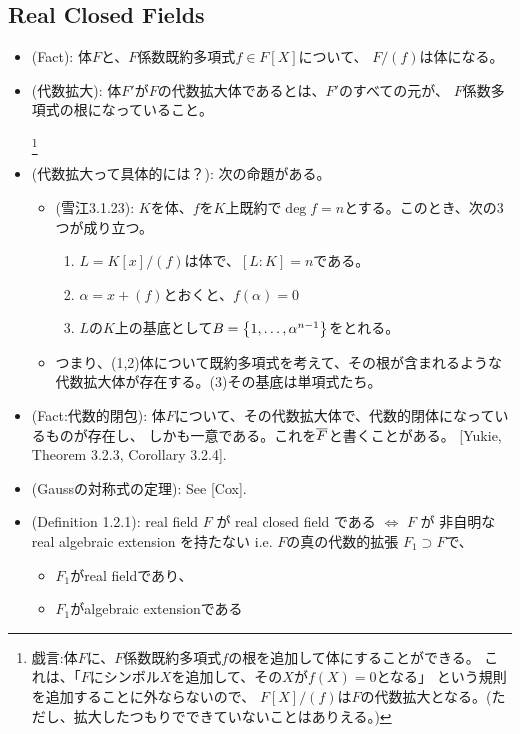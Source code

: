 \documentclass[9pt]{ltjsarticle}
\begin{document}
\subsection{Real Closed Fields}
\label{sub:Real Closed Fields}
\begin{itemize}
  \item (Fact):
  体$F$と、$F$係数既約多項式$f\in F[X]$について、
  $F/(f)$は体になる。
  \item (代数拡大):
  体$F'$が$F$の代数拡大体であるとは、$F'$のすべての元が、
  $F$係数多項式の根になっていること。

  \footnote{戯言:体$F$に、$F$係数既約多項式$f$の根を追加して体にすることができる。
  これは、「$F$にシンボル$X$を追加して、その$X$が$f(X)=0$となる」
  という規則を追加することに外ならないので、
  $F[X]/(f)$は$F$の代数拡大となる。(ただし、拡大したつもりでできていないことはありえる。)}
  \item
  (代数拡大って具体的には？):
  次の命題がある。
  \begin{itemize}
    \item (雪江3.1.23):
    $K$を体、$f$を$K$上既約で$\deg f=n$とする。このとき、次の3つが成り立つ。
    \begin{enumerate}[label=(\arabic*)]
      \item $L=K[x]/(f)$は体で、$[L:K]=n$である。
      \item $\alpha = x+(f)$とおくと、$f(\alpha)=0$
      \item $L$の$K$上の基底として$B=\left\{1,\dots,\alpha^{n-1}\right\}$をとれる。
    \end{enumerate}
    \item
    つまり、(1,2)体について既約多項式を考えて、その根が含まれるような
    代数拡大体が存在する。(3)その基底は単項式たち。
  \end{itemize}
  \item (Fact:代数的閉包):
  体$F$について、その代数拡大体で、代数的閉体になっているものが存在し、
  しかも一意である。これを$\overline{F}$と書くことがある。
  [Yukie, Theorem 3.2.3, Corollary 3.2.4].
  \item (Gaussの対称式の定理):
  See [Cox].
  \item (Definition 1.2.1):
  real field $F$ が real closed field である $\iff$
  $F$ が 非自明な real algebraic extension を持たない
  i.e. $F$の真の代数的拡張 $F_1 \supset F$で、
  \begin{itemize}
    \item $F_1$がreal fieldであり、
    \item $F_1$がalgebraic extensionである

\end{itemize}
\end{itemize}
\end{document}
